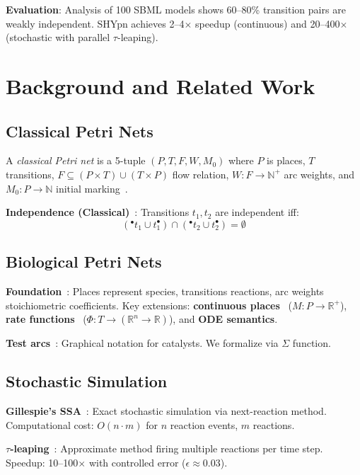 \documentclass[twocolumn,11pt]{article}
\newcommand{\preset}[1]{\ensuremath{{}^{\bullet}#1}}
\newcommand{\postset}[1]{\ensuremath{#1^{\bullet}}}
\begin{document}
\textbf{Evaluation}: Analysis of 100 SBML models shows 60--80\% transition pairs are weakly independent. SHYpn achieves 2--4$\times$ speedup (continuous) and 20--400$\times$ (stochastic with parallel $\tau$-leaping).

\section{Background and Related Work}

\subsection{Classical Petri Nets}

A \emph{classical Petri net} is a 5-tuple $(P, T, F, W, M_0)$ where $P$ is places, $T$ transitions, $F \subseteq (P \times T) \cup (T \times P)$ flow relation, $W: F \to \mathbb{N}^+$ arc weights, and $M_0: P \to \mathbb{N}$ initial marking~\cite{Murata1989}.

\textbf{Independence (Classical)}~\cite{Reisig2013}: Transitions $t_1, t_2$ are independent iff:
\begin{equation}
(\preset{t_1} \cup \postset{t_1}) \cap (\preset{t_2} \cup \postset{t_2}) = \emptyset
\end{equation}

\subsection{Biological Petri Nets}

\textbf{Foundation}~\cite{Reddy1993}: Places represent species, transitions reactions, arc weights stoichiometric coefficients. Key extensions: \textbf{continuous places}~\cite{Heiner2008} ($M: P \to \mathbb{R}^+$), \textbf{rate functions}~\cite{Gilbert2006} ($\Phi: T \to (\mathbb{R}^n \to \mathbb{R})$), and \textbf{ODE semantics}.

\textbf{Test arcs}~\cite{Koch2011}: Graphical notation for catalysts. We formalize via $\Sigma$ function.

\subsection{Stochastic Simulation}

\textbf{Gillespie's SSA}~\cite{Gillespie1977}: Exact stochastic simulation via next-reaction method. Computational cost: $O(n \cdot m)$ for $n$ reaction events, $m$ reactions.

\textbf{$\tau$-leaping}~\cite{Gillespie2001}: Approximate method firing multiple reactions per time step. Speedup: 10--100$\times$ with controlled error ($\epsilon \approx 0.03$).
\end{document}
